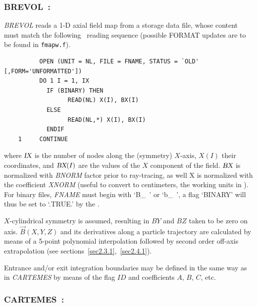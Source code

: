 \vfill
\newpage


\subsubsection*{BREVOL~: \BREVOLTitl} \label{BREVOL}
\medskip

\textsl{BREVOL}  reads a 1-D axial field map from a storage data file,
whose content must match the following \FORTRAN\ reading sequence (possible FORMAT updates are to be found in \texttt{fmapw.f}).   

\bigskip


{\footnotesize
\begin{verbatim}
	      OPEN (UNIT = NL, FILE = FNAME, STATUS = `OLD' [,FORM='UNFORMATTED'])
	      DO 1 I = 1, IX
	        IF (BINARY) THEN 
	              READ(NL) X(I), BX(I)
	        ELSE
	              READ(NL,*) X(I), BX(I)
	        ENDIF
	1     CONTINUE
\end{verbatim}}
\medskip

\noindent where $\textsl{IX}$ is the number of nodes along the (symmetry) $X$-axis, $X(I)$
their coordinates, and $\textsl{BX}(I)$ are the values of the $X$ component of the field. $\textsl{BX}$ is 
normalized with \textsl{BNORM} factor prior to ray-tracing, as well  X is normalized with 
 the coefficient  \textsl{XNORM}  (useful to convert to centimeters, the working units in  \zgoubi). 
For binary files, \textsl{FNAME} must begin with \mbox{`B\_ '} or  \mbox{`b\_ '}, 
a flag `BINARY' will thus be set to `.TRUE.' by the \FORTRAN.  

\bigskip

\noindent $X$-cylindrical symmetry is assumed, resulting in $BY$ and $BZ$ taken to 
be zero on axis. $ \vec {B} {(X,Y,Z)} $ and its derivatives along a
particle trajectory are calculated by means of a 5-point polynomial interpolation followed by second 
order off-axis  extrapolation (see sections~\ref{sec2.3.1},~\ref{sec2.4.1}).  
\bigskip

\noindent Entrance and/or exit integration boundaries may be defined in the same way 
as in \textsl{CARTEMES} by means of the flag $ID$ and coefficients
$A$, $B$, $C$, etc. 

\newpage

\subsubsection*{CARTEMES~: \CARTEMESTitl}\label{CARTEMES}
\medskip

